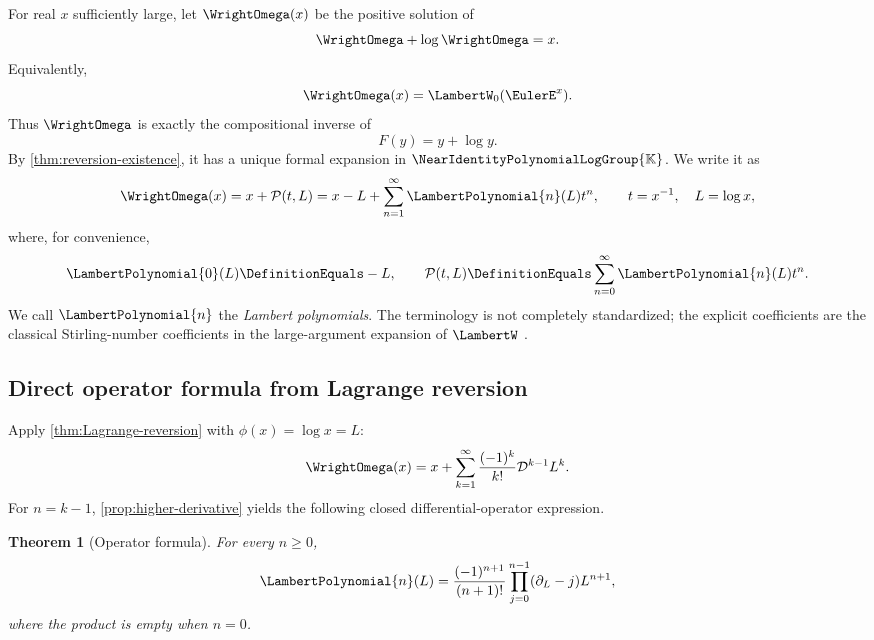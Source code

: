 \documentclass[11pt]{article}
\theoremstyle{pltheorem}
\newtheorem{theorem}{Theorem}[section]
\newcommand{\K}{\mathbb K}
\newcommand{\Gnear}{\NearIdentityPolynomialLogGroup{\K}}
\newcommand{\D}{\mathcal D}
\begin{document}
For real \(x\) sufficiently large, let \(\WrightOmega(x)\) be the positive solution of
\begin{equation}\label{eq:omega-equation}
 \WrightOmega+\log\WrightOmega=x.
\end{equation}
Equivalently,
\begin{equation}\label{eq:omega-W}
 \WrightOmega(x)=\LambertW_0(\EulerE^x).
\end{equation}
Thus \(\WrightOmega\) is exactly the compositional inverse of
\begin{equation}\label{eq:F-log-map}
 F(y)=y+\log y.
\end{equation}
By \cref{thm:reversion-existence}, it has a unique formal expansion in \(\Gnear\).  We write it as
\begin{equation}\label{eq:omega-expansion}
 \WrightOmega(x)=x+\mathcal P(t,L)
 =x-L+\sum_{n=1}^{\infty}\LambertPolynomial{n}(L)t^n,
 \qquad t=x^{-1},\quad L=\log x,
\end{equation}
where, for convenience,
\begin{equation}\label{eq:P0-def}
 \LambertPolynomial{0}(L)\DefinitionEquals-L,
 \qquad
 \mathcal P(t,L)\DefinitionEquals\sum_{n=0}^{\infty}\LambertPolynomial{n}(L)t^n.
\end{equation}
We call \(\LambertPolynomial{n}\) the \emph{Lambert polynomials}.  The terminology is not completely standardized; the explicit coefficients are the classical Stirling-number coefficients in the large-argument expansion of \(\LambertW\) \cite{comtet1970,jeffrey-et-al-1995,corless-et-al-1996,dlmf-W}.

\subsection{Direct operator formula from Lagrange reversion}

Apply \cref{thm:Lagrange-reversion} with \(\phi(x)=\log x=L\):
\begin{equation}\label{eq:omega-Lagrange}
 \WrightOmega(x)=x+
 \sum_{k=1}^{\infty}\frac{(-1)^k}{k!}
 \D^{k-1}L^k.
\end{equation}
For \(n=k-1\), \cref{prop:higher-derivative} yields the following closed differential-operator expression.

\begin{theorem}[Operator formula]\label{thm:P-operator}
For every \(n\ge0\),
\begin{equation}\label{eq:P-operator}
 \LambertPolynomial{n}(L)=\frac{(-1)^{n+1}}{(n+1)!}
 \prod_{j=0}^{n-1}(\partial_L-j)L^{n+1},
\end{equation}
where the product is empty when \(n=0\).
\end{theorem}
\end{document}
